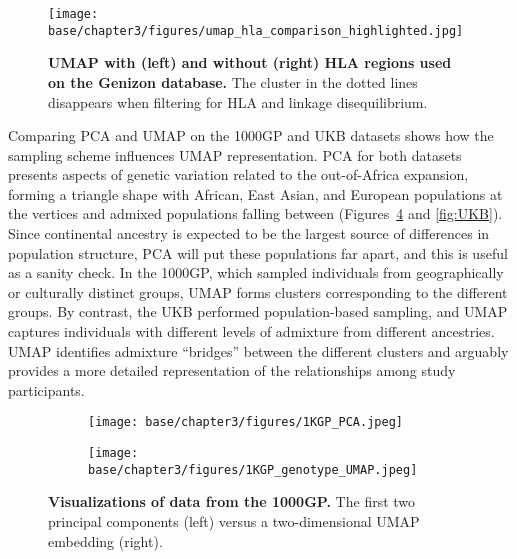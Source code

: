 \begin{figure}[h]
  \centering
    \texttt{[image: base/chapter3/figures/umap\_hla\_comparison\_highlighted.jpg]}
  \caption[UMAP with and without HLA regions filtered]{\textbf{UMAP with (left) and without (right) HLA regions used on the Genizon database.} The cluster in the dotted lines disappears when filtering for HLA and linkage disequilibrium.}
  \label{fig:HLA}
\end{figure}

Comparing PCA and UMAP on the 1000GP and UKB datasets shows how the sampling scheme influences UMAP representation. PCA for both datasets presents aspects of genetic variation related to the out-of-Africa expansion, forming a triangle shape with African, East Asian, and European populations at the vertices and admixed populations falling between (Figures~\ref{fig:PCA_and_UMAP} and \ref{fig:UKB}). Since continental ancestry is expected to be the largest source of differences in population structure, PCA will put these populations far apart, and this is useful as a sanity check. In the 1000GP, which sampled individuals from geographically or culturally distinct groups, UMAP forms clusters corresponding to the different groups. By contrast, the UKB performed population-based sampling, and UMAP captures individuals with different levels of admixture from different ancestries. UMAP identifies admixture ``bridges'' between the different clusters and arguably provides a more detailed representation of the relationships among study participants. 

\begin{figure}[h]
  \centering
  \begin{subfigure}[b]{0.45\linewidth}
    \texttt{[image: base/chapter3/figures/1KGP\_PCA.jpeg]}
    \caption{}
    \label{fig:PCA}
  \end{subfigure}
  \begin{subfigure}[b]{0.45\linewidth}
    \texttt{[image: base/chapter3/figures/1KGP\_genotype\_UMAP.jpeg]}
    \caption{}
    \label{fig:UMAP}
  \end{subfigure}
  \caption[PCA compared to UMAP of the 1KGP]{\textbf{Visualizations of data from the 1000GP.} The first two principal components (left) versus a two-dimensional UMAP embedding (right).}
  \label{fig:PCA_and_UMAP}
\end{figure}

